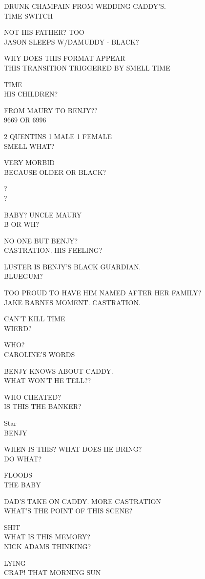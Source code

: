 \documentclass[10pt,letterpaper]{article}
\begin{document}
DRUNK CHAMPAIN FROM WEDDING CADDY'S.\\
TIME SWITCH

NOT HIS FATHER? TOO\\
JASON SLEEPS W/DAMUDDY {-} BLACK?

WHY DOES THIS FORMAT APPEAR\\
THIS TRANSITION TRIGGERED BY SMELL TIME

TIME\\
HIS CHILDREN?

FROM MAURY TO BENJY??\\
9669 OR 6996

2 QUENTINS 1 MALE 1 FEMALE\\
SMELL WHAT?

VERY MORBID\\
BECAUSE OLDER OR BLACK?

?\\
?

BABY? UNCLE MAURY\\
B OR WH?

NO ONE BUT BENJY?\\
CASTRATION. HIS FEELING?

LUSTER IS BENJY'S BLACK GUARDIAN.\\
BLUEGUM?

TOO PROUD TO HAVE HIM NAMED AFTER HER FAMILY?\\
JAKE BARNES MOMENT. CASTRATION.

CAN'T KILL TIME\\
WIERD?

WHO?\\
CAROLINE'S WORDS

BENJY KNOWS ABOUT CADDY.\\
WHAT WON'T HE TELL??

WHO CHEATED?\\
IS THIS THE BANKER?

Star\\
BENJY

WHEN IS THIS? WHAT DOES HE BRING?\\
DO WHAT?

FLOODS\\
THE BABY

DAD'S TAKE ON CADDY.  MORE CASTRATION\\
WHAT'S THE POINT OF THIS SCENE?

SHIT\\
WHAT IS THIS MEMORY?\\
NICK ADAMS THINKING?

LYING\\
CRAP! THAT MORNING SUN
\end{document}
